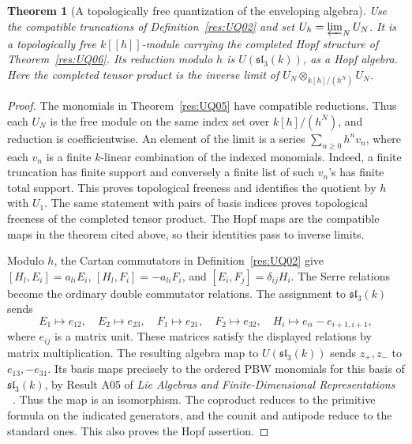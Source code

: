 \documentclass[11pt,oneside,openany]{book}
\newtheorem{theorem}{Theorem}[chapter]
\theoremstyle{definition}
\theoremstyle{remark}
\begin{document}
\begin{theorem}[A topologically free quantization of the enveloping algebra]
\label{res:UQ07}
Use the compatible truncations of Definition~\ref{res:UQ02}
and set \(U_h=\varprojlim_N U_N\).
It is a topologically free \(k[[h]]\)-module carrying the
completed Hopf structure of Theorem~\ref{res:UQ06}.
Its reduction modulo \(h\) is \(U(\mathfrak{sl}_3(k))\),
as a Hopf algebra. Here the completed tensor product
is the inverse limit of \(U_N\otimes_{k[h]/(h^N)} U_N\).
\end{theorem}
\begin{proof}
The monomials in Theorem~\ref{res:UQ05} have compatible
reductions. Thus each \(U_N\) is the free module on the
same index set over \(k[h]/(h^N)\), and reduction is
coefficientwise. An element of the limit is a series
\(\sum_{n\ge0}h^n v_n\), where each \(v_n\) is a finite
\(k\)-linear combination of the indexed monomials.
Indeed, a finite truncation has finite support and
conversely a finite list of such \(v_n\)'s has finite
total support. This proves topological freeness and
identifies the quotient by \(h\) with \(U_1\).
The same statement with pairs of basis indices proves
topological freeness of the completed tensor product.
The Hopf maps are the compatible maps in the theorem
cited above, so their identities pass to inverse limits.

Modulo \(h\), the Cartan commutators in Definition~\ref{res:UQ02}
give \([H_l,E_i]=a_{li}E_i\), \([H_l,F_i]=-a_{li}F_i\),
and \([E_i,F_j]=\delta_{ij}H_i\). The Serre relations
become the ordinary double commutator relations.
The assignment to \(\mathfrak{sl}_3(k)\) sends
\[
 E_1\mapsto e_{12},\quad E_2\mapsto e_{23},\quad
 F_1\mapsto e_{21},\quad F_2\mapsto e_{32},\quad
 H_i\mapsto e_{ii}-e_{i+1,i+1},
\]
where \(e_{ij}\) is a matrix unit. These matrices satisfy
the displayed relations by matrix multiplication.
The resulting algebra map to \(U(\mathfrak{sl}_3(k))\)
sends \(z_+,z_-\) to \(e_{13},-e_{31}\).
Its basis maps precisely to the ordered PBW monomials
for this basis of \(\mathfrak{sl}_3(k)\), by Result A05 of
\emph{Lie Algebras and Finite-Dimensional Representations}
~\cite[PDF pp.~8--9]{mg-lie}. Thus the map is an
isomorphism. The coproduct reduces to the primitive formula
on the indicated generators, and the counit and antipode
reduce to the standard ones. This also proves the
Hopf assertion.
\end{proof}
\end{document}
